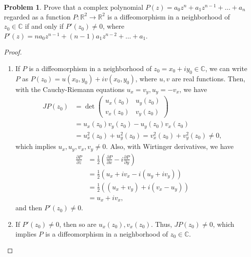\documentclass[11pt]{article}
\theoremstyle{definition}
\newtheorem{problem}{Problem}
\theoremstyle{definition}
\begin{document}
\begin{problem}
Prove that a complex polynomial
$P(z)=a_0z^n+a_1 z^{n-1} + \ldots + a_n$
regarded as a function $P:\mathbb{R}^2\to\mathbb{R}^2$ is a diffeomorphism in a neighborhood of $z_0\in\mathbb{C}$
if and only if $P'(z_0)\neq 0$, where
$P'(z)=na_0 z^{n-1} + (n-1)a_1 z^{n-2} + \ldots + a_1$.
\end{problem}
\begin{proof}
~\begin{enumerate}[label=(\alph*)]
    \item If $P$ is a diffeomorphism in a neighborhood of $z_0 = x_0 + i y_0 \in\mathbb{C}$, we can write $P$ as $P(z_0) = u(x_0, y_0) + i v(x_0, y_0)$, where $u,v$ are real functions. Then, with the Cauchy-Riemann equations $u_x = v_y, u_y = -v_x$, we have
    \begin{align*}
        JP(z_0) & = \det \begin{pmatrix}
        u_x(z_0) & u_y(z_0) \\
        v_x(z_0) & v_y(z_0)
        \end{pmatrix} \\
        & = u_x(z_0) v_y(z_0) - u_y(z_0) v_x(z_0) \\
        & = u_x^2(z_0) + u_y^2(z_0) = v_x^2(z_0) + v_y^2(z_0) \neq 0,
    \end{align*}
    which implies $u_x, u_y, v_x, v_y \neq 0$. Also, with Wirtinger derivatives, we have 
    \begin{align*}
        \frac{\partial P}{\partial z} &= \frac12\left(\frac{\partial P}{\partial x} - i\frac{\partial P}{\partial y}\right)\\
        &= \frac12\left(u_x+iv_x - i(u_y+iv_y)\right)\\
        &= \frac12\left((u_x+v_y) + i(v_x-u_y)\right)\\
        &= u_x + iv_x,
    \end{align*}
    and then $P'(z_0) \neq 0$.
    
    \item If $P'(z_0) \neq 0$, then so are $u_x(z_0), v_x(z_0)$. Thus, $JP(z_0) \neq 0$, which implies $P$ is a diffeomorphism in a neighborhood of $z_0 \in\mathbb{C}$.
\end{enumerate}
\end{proof}

\medskip
\end{document}
